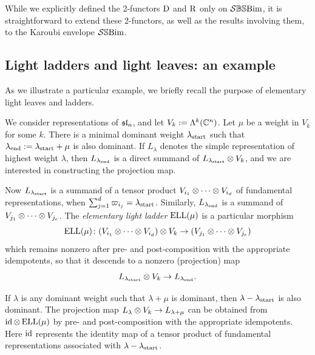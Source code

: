 \begin{remark}
    While we explicitly defined the 2-functors $\mathrm{D}$ and $\mathrm{R}$ only on $\mathcal{S}\mathbb{BS}\text{Bim}$, it is straightforward to extend these 2-functors, as well as the results involving them, to the Karoubi envelope $\mathcal{S}\mathbb{S}\text{Bim}$.
\end{remark}


\subsection{Light ladders and light leaves: an example} \label{subsec:LLappendix}

As we illustrate a particular example, we briefly recall the purpose of elementary light leaves and ladders.

We consider representations of $\mathfrak{sl}_n$, and let $V_k := \Lambda^k(\mathbb{C}^n)$. Let $\mu$ be a weight in $V_k$ for some $k$. There is a minimal dominant weight $\lambda_{\operatorname{start}}$ such that $\lambda_{\operatorname{end}} := \lambda_{\operatorname{start}} + \mu$ is also dominant. If $L_{\lambda}$ denotes the simple representation of highest weight $\lambda$, then $L_{\lambda_{\operatorname{end}}}$ is a direct summand of $L_{\lambda_{\operatorname{start}}} \otimes V_k$, and we are interested in constructing the projection map.

Now $L_{\lambda_{\operatorname{start}}}$ is a summand of a tensor product $V_{i_1} \otimes \cdots \otimes V_{i_d}$ of fundamental representations, when $\sum_{j=1}^d \varpi_{i_j} = \lambda_{\operatorname{start}}$. Similarly, $L_{\lambda_{\operatorname{end}}}$ is a summand of $V_{j_1} \otimes \cdots \otimes V_{j_e}$. The \emph{elementary light ladder} $\operatorname{ELL}(\mu)$ is a particular morphism
\[ \operatorname{ELL}(\mu) \colon (V_{i_1} \otimes \cdots \otimes V_{i_d}) \otimes V_k \to (V_{j_1} \otimes \cdots \otimes V_{j_e}) \]
which remains nonzero after pre- and post-composition with the appropriate idempotents, so that it descends to a nonzero (projection) map
\[ L_{\lambda_{\operatorname{start}}} \otimes V_k \to L_{\lambda_{\operatorname{end}}}.\]

\begin{remark} \label{rmk:whenlambdanotminimal} If $\lambda$ is any dominant weight such that $\lambda + \mu$ is dominant, then $\lambda - \lambda_{\operatorname{start}}$ is also dominant. The projection map $L_{\lambda} \otimes V_k \to L_{\lambda + \mu}$ can be obtained from $\operatorname{id} \otimes \operatorname{ELL}(\mu)$ by pre- and post-composition with the appropriate idempotents. Here $\operatorname{id}$ represents the identity map of a tensor product of fundamental representations associated with $\lambda - \lambda_{\operatorname{start}}$. \end{remark}

